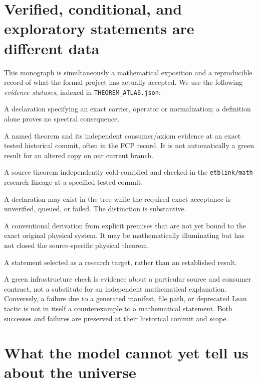 \section{Verified, conditional, and exploratory statements are different data}

This monograph is simultaneously a mathematical exposition and a
reproducible record of what the formal project has actually accepted.
We use the following \emph{evidence statuses}, indexed in
\texttt{THEOREM\_ATLAS.json}:
\begin{description}[leftmargin=1.4em,style=nextline]
 \item[Original source definition.] A declaration specifying an exact
 carrier, operator or normalization; a definition alone proves no
 spectral consequence.
 \item[Historically strict-qualified.] A named theorem and its
 independent consumer/axiom evidence at an exact tested historical
 commit, often in the FCP record. It is not automatically a green
 result for an altered copy on our current branch.
 \item[Integrated strict-qualified.] A source theorem independently
 cold-compiled and checked in the \texttt{etblink/math} research
 lineage at a specified tested commit.
 \item[Source present or qualification pending.] A declaration may
 exist in the tree while the required exact acceptance is unverified,
 queued, or failed. The distinction is substantive.
 \item[Conditional analytical argument.] A conventional derivation
 from explicit premises that are not yet bound to the exact original
 physical system. It may be mathematically illuminating but has not
 closed the source-specific physical theorem.
 \item[Open proof obligation.] A statement selected as a research
 target, rather than an established result.
\end{description}
A green infrastructure check is evidence about a particular source
and consumer contract, not a substitute for an independent
mathematical explanation. Conversely, a failure due to a generated
manifest, file path, or deprecated Lean tactic is not in itself a
counterexample to a mathematical statement. Both successes and
failures are preserved at their historical commit and scope.

\section{What the model cannot yet tell us about the universe}

